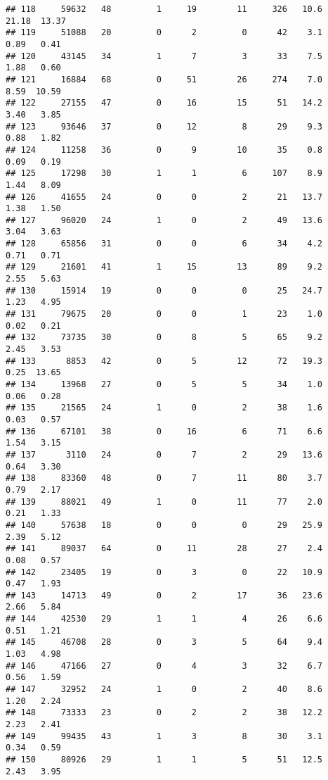 \documentclass[
]{article}
\begin{document}
\begin{verbatim}
## 118     59632   48         1     19        11     326   10.6   21.18  13.37
## 119     51088   20         0      2         0      42    3.1    0.89   0.41
## 120     43145   34         1      7         3      33    7.5    1.88   0.60
## 121     16884   68         0     51        26     274    7.0    8.59  10.59
## 122     27155   47         0     16        15      51   14.2    3.40   3.85
## 123     93646   37         0     12         8      29    9.3    0.88   1.82
## 124     11258   36         0      9        10      35    0.8    0.09   0.19
## 125     17298   30         1      1         6     107    8.9    1.44   8.09
## 126     41655   24         0      0         2      21   13.7    1.38   1.50
## 127     96020   24         1      0         2      49   13.6    3.04   3.63
## 128     65856   31         0      0         6      34    4.2    0.71   0.71
## 129     21601   41         1     15        13      89    9.2    2.55   5.63
## 130     15914   19         0      0         0      25   24.7    1.23   4.95
## 131     79675   20         0      0         1      23    1.0    0.02   0.21
## 132     73735   30         0      8         5      65    9.2    2.45   3.53
## 133      8853   42         0      5        12      72   19.3    0.25  13.65
## 134     13968   27         0      5         5      34    1.0    0.06   0.28
## 135     21565   24         1      0         2      38    1.6    0.03   0.57
## 136     67101   38         0     16         6      71    6.6    1.54   3.15
## 137      3110   24         0      7         2      29   13.6    0.64   3.30
## 138     83360   48         0      7        11      80    3.7    0.79   2.17
## 139     88021   49         1      0        11      77    2.0    0.21   1.33
## 140     57638   18         0      0         0      29   25.9    2.39   5.12
## 141     89037   64         0     11        28      27    2.4    0.08   0.57
## 142     23405   19         0      3         0      22   10.9    0.47   1.93
## 143     14713   49         0      2        17      36   23.6    2.66   5.84
## 144     42530   29         1      1         4      26    6.6    0.51   1.21
## 145     46708   28         0      3         5      64    9.4    1.03   4.98
## 146     47166   27         0      4         3      32    6.7    0.56   1.59
## 147     32952   24         1      0         2      40    8.6    1.20   2.24
## 148     73333   23         0      2         2      38   12.2    2.23   2.41
## 149     99435   43         1      3         8      30    3.1    0.34   0.59
## 150     80926   29         1      1         5      51   12.5    2.43   3.95

\end{verbatim}
\end{document}
